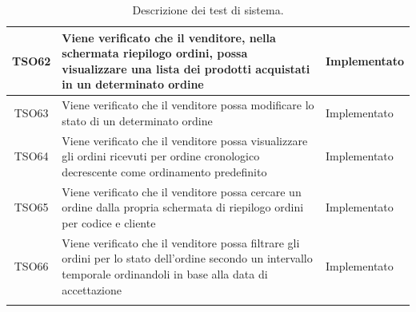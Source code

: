 \begin{longtable}{|c| C{10cm} |C{3cm}|}
    	TSO62 & Viene verificato che il venditore, nella schermata riepilogo ordini,  possa visualizzare una lista dei prodotti acquistati in un determinato ordine & Implementato\\ \hline
    	TSO63 & Viene verificato che il venditore possa modificare lo stato di un determinato ordine & Implementato\\ \hline
	TSO64 & Viene verificato che il venditore possa visualizzare gli ordini ricevuti per ordine cronologico decrescente come ordinamento predefinito & Implementato\\ \hline
	TSO65 & Viene verificato che il venditore possa cercare un ordine dalla propria schermata di riepilogo ordini per codice e cliente & Implementato\\ \hline
    	TSO66 & Viene verificato che il venditore possa filtrare gli ordini per lo stato dell'ordine secondo un intervallo temporale ordinandoli in base alla data di accettazione & Implementato\\ \hline
    	\caption{Descrizione dei test di sistema.}
\end{longtable}
